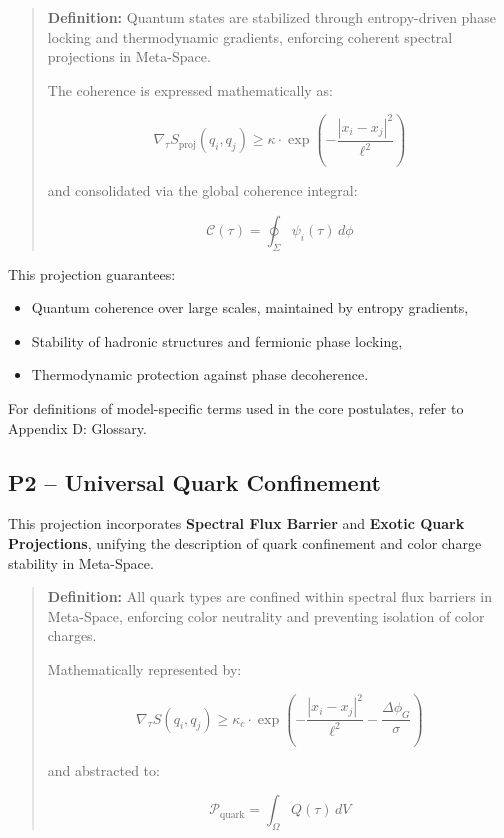 \documentclass[10.5pt,a4paper]{article}
\begin{document}
\begin{quote}
\textbf{Definition:}  
Quantum states are stabilized through entropy-driven phase locking and thermodynamic gradients, enforcing coherent spectral projections in Meta-Space.

The coherence is expressed mathematically as:

\[
\nabla_\tau S_{\text{proj}}(q_i, q_j) \geq \kappa \cdot \exp\left(-\frac{|x_i - x_j|^2}{\ell^2}\right)
\]

and consolidated via the global coherence integral:

\[
\mathcal{C}(\tau) = \oint_\Sigma \psi_i(\tau) \, d\phi
\]
\end{quote}

This projection guarantees:
\begin{itemize}
    \item Quantum coherence over large scales, maintained by entropy gradients,
    \item Stability of hadronic structures and fermionic phase locking,
    \item Thermodynamic protection against phase decoherence.
\end{itemize}

For definitions of model-specific terms used in the core postulates, refer to Appendix D: Glossary.

\subsection{P2 – Universal Quark Confinement}

This projection incorporates \textbf{Spectral Flux Barrier} and \textbf{Exotic Quark Projections}, 
unifying the description of quark confinement and color charge stability in Meta-Space.

\begin{quote}
\textbf{Definition:}  
All quark types are confined within spectral flux barriers in Meta-Space, enforcing color neutrality 
and preventing isolation of color charges.

Mathematically represented by:

\[
\nabla_\tau S(q_i, q_j) \geq \kappa_c \cdot \exp\left(-\frac{|x_i - x_j|^2}{\ell^2} - \frac{\Delta \phi_G}{\sigma}\right)
\]

and abstracted to:

\[
\mathcal{P}_{\text{quark}} = \int_\Omega Q(\tau) \, dV
\]
\end{quote}
\end{document}
